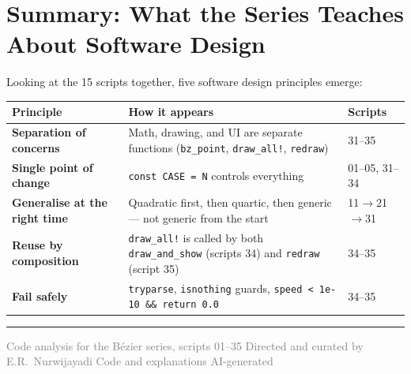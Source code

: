 \documentclass[12pt, a4paper]{article}
\newcommand{\cd}[1]{\texttt{#1}}
\begin{document}
\section{Summary: What the Series Teaches About Software Design}

Looking at the 15 scripts together, five software design
principles emerge:

\begin{center}
\renewcommand{\arraystretch}{1.4}
\begin{tabular}{lp{5cm}p{5cm}}
\toprule
Principle & How it appears & Scripts \\
\midrule
\textbf{Separation of concerns} &
  Math, drawing, and UI are separate functions
  (\cd{bz\_point}, \cd{draw\_all!}, \cd{redraw}) &
  31--35 \\[4pt]
\textbf{Single point of change} &
  \cd{const CASE = N} controls everything &
  01--05, 31--34 \\[4pt]
\textbf{Generalise at the right time} &
  Quadratic first, then quartic, then generic ---
  not generic from the start &
  11$\to$21$\to$31 \\[4pt]
\textbf{Reuse by composition} &
  \cd{draw\_all!} is called by both \cd{draw\_and\_show}
  (scripts 34) and \cd{redraw} (script 35) &
  34--35 \\[4pt]
\textbf{Fail safely} &
  \cd{tryparse}, \cd{isnothing} guards,
  \cd{speed < 1e-10 \&\& return 0.0} &
  34--35 \\
\bottomrule
\end{tabular}
\end{center}

\vspace{2em}\hrule\vspace{0.5em}
{\small\textcolor{gray}{%
Code analysis for the B\'ezier series, scripts 01--35
\textbar{} Directed and curated by E.R.\ Nurwijayadi
\textbar{} Code and explanations AI-generated}}
\end{document}
